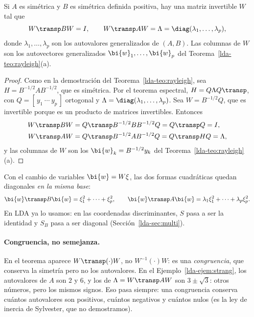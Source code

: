 \begin{theorem}\label{lda-teo:simultanea}
Si $A$ es simétrica y $B$ es simétrica definida positiva, hay una matriz
invertible $W$ tal que
\[
W\transp BW=I,\qquad W\transp AW=\Lambda=\diag(\lambda_1,\dots,\lambda_p),
\]
donde $\lambda_1,\dots,\lambda_p$ son los autovalores generalizados de $(A,B)$.
Las columnas de $W$ son los autovectores generalizados $\bi{w}_1,\dots,\bi{w}_p$ del
Teorema~\ref{lda-teo:rayleigh}(a).
\end{theorem}

\begin{proof}
Como en la demostración del Teorema~\ref{lda-teo:rayleigh}, sea
$H=B^{-1/2}AB^{-1/2}$, que es simétrica. Por el teorema espectral,
$H=Q\Lambda Q\transp$, con $Q=[\,y_1\ \cdots\ y_p\,]$ ortogonal y
$\Lambda=\diag(\lambda_1,\dots,\lambda_p)$. Sea $W=B^{-1/2}Q$, que es invertible
porque es un producto de matrices invertibles. Entonces
\begin{align*}
W\transp BW&=Q\transp B^{-1/2}BB^{-1/2}Q=Q\transp Q=I,\\
W\transp AW&=Q\transp B^{-1/2}AB^{-1/2}Q=Q\transp HQ=\Lambda ,
\end{align*}
y las columnas de $W$ son los $\bi{w}_k=B^{-1/2}y_k$ del Teorema~\ref{lda-teo:rayleigh}(a).
\end{proof}

Con el cambio de variables $\bi{w}=W\xi$, las dos formas cuadráticas quedan
diagonales \emph{en la misma base}:
\[
\bi{w}\transp B\bi{w}=\xi_1^2+\dots+\xi_p^2,\qquad \bi{w}\transp A\bi{w}=\lambda_1\xi_1^2+\dots+\lambda_p\xi_p^2 .
\]
En LDA ya lo usamos: en las coordenadas discriminantes, $S$ pasa a ser la
identidad y $S_B$ pasa a ser diagonal (Sección~\ref{lda-sec:multi}).

\paragraph{Congruencia, no semejanza.} En el teorema aparece $W\transp(\cdot)W$,
no $W^{-1}(\cdot)W$: es una \emph{congruencia}, que conserva la simetría pero
no los autovalores. En el Ejemplo~\ref{lda-ejem:strang}, los autovalores de $A$
son $2$ y $6$, y los de $\Lambda=W\transp AW$ son $3\pm\sqrt3$: otros números,
pero los mismos signos. Eso pasa siempre: una congruencia conserva cuántos
autovalores son positivos, cuántos negativos y cuántos nulos (es la ley de
inercia de Sylvester, que no demostramos).

